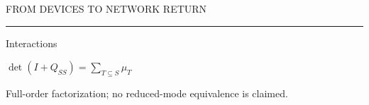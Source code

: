 {\begin{minipage}[t][\PosterFourHeight][t]{\PosterHalfWidth}
\begin{PosterPanel}{\PosterFourHeight}{}{FROM DEVICES TO NETWORK RETURN}
    \noindent\color{IASRule}\rule{\linewidth}{0.8pt}\par
    \noindent\begin{minipage}[c][29mm][c]{85mm}
      {\PosterCompactHeadingType\color{IASDarkGreen}Interactions\par}
    \end{minipage}\hspace{4mm}%
    \begin{minipage}[c][29mm][c]{327mm}
      {\PosterEquationShortType\color{IASDarkText}$\displaystyle\det(I+Q_{SS})=\sum_{T\subseteq S}\mu_T$\par}
    \end{minipage}\par
    \vspace{1mm}
    {\FigureSize\color{IASGray}Full-order factorization; no reduced-mode equivalence is claimed.\par}
  \end{PosterPanel}
\end{minipage}%
}%
\ifdefined\PosterFull
  \PosterSectionContent
  \let\PosterSectionFinish\relax
\else
  \def\PosterPageWidth{\PosterPreviewHalfPageWidth}
  \def\PosterPageHeight{\PosterPreviewFourPageHeight}
  \def\PosterPreviewLeft{\PosterPreviewHalfLeft}
  
  \begin{frame}[t]
  \vspace*{\PosterPreviewTop}
  \noindent\hspace*{\PosterPreviewLeft}%
  \PosterSectionContent
  \end{frame}
  \def\PosterSectionFinish{}
\fi
\PosterSectionFinish
